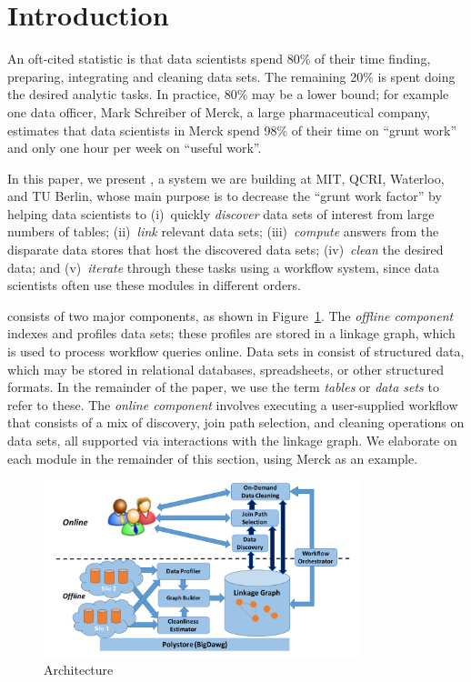 \section{Introduction}
\label{introduction}

An oft-cited statistic is that data scientists spend 80\% of their time finding, preparing, integrating and cleaning data sets. The remaining 20\% is spent doing the desired analytic tasks. In practice, 80\% may be a lower bound; for example one data officer, Mark Schreiber of Merck, a large pharmaceutical company, estimates that data scientists in Merck spend 98\% of their time on ``grunt work'' and only one hour per week on ``useful work''.

In this paper, we present \dcv, a system we are building at MIT, QCRI, Waterloo, and TU Berlin, whose main purpose is to decrease the ``grunt work factor'' by helping data scientists to 
(i)~quickly {\it discover} data sets of interest from large numbers of tables;
(ii)~{\it link} relevant data sets; %
(iii)~{\it compute} answers from the disparate data stores that host the discovered data sets;
(iv)~{\it clean} the desired data; and %
(v)~{\it iterate} through these tasks using a workflow system, since data scientists often use these modules in different orders.


\dcv consists of two major components, as shown in 
Figure~\ref{fig:arch}.  
The {\it offline component} indexes and profiles data sets;  these profiles are stored  in a linkage graph, which is used to process workflow queries online. 
Data sets in \dcv consist of structured data, which may be stored in relational databases, spreadsheets, or other structured formats. In the remainder of the paper, we use the term {\it tables} or {\it data sets} to refer to these.
The {\it online component} involves executing a user-supplied workflow that consists of a mix of discovery, join path selection, and cleaning operations on data sets, all supported via interactions with the linkage graph. We elaborate on each module in the remainder of this section, using Merck as an example.


\begin{figure}[!t]
\includegraphics[width=3.6in]{arch3.pdf}
\caption{\dcv Architecture}
\label{fig:arch}
\end{figure}


